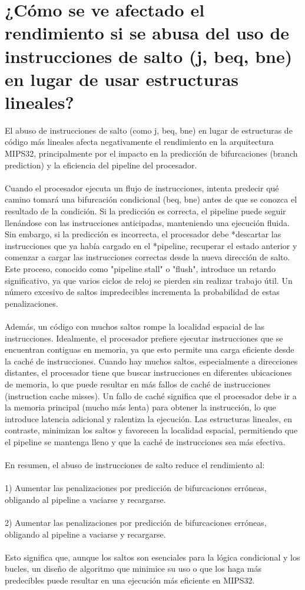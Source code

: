 \documentclass{article}
\begin{document}
\section{¿Cómo se ve afectado el rendimiento si se abusa del uso de instrucciones de salto (j, beq, bne) en lugar de usar estructuras lineales?}
El abuso de instrucciones de salto (como j, beq, bne) en lugar de estructuras de código más lineales afecta negativamente el rendimiento en la arquitectura MIPS32, principalmente por el impacto en la predicción de bifurcaciones (branch prediction) y la eficiencia del pipeline del procesador.
\\
\\Cuando el procesador ejecuta un flujo de instrucciones, intenta predecir qué camino tomará una bifurcación condicional (beq, bne) antes de que se conozca el resultado de la condición. Si la predicción es correcta, el pipeline puede seguir llenándose con las instrucciones anticipadas, manteniendo una ejecución fluida. Sin embargo, si la predicción es incorrecta, el procesador debe *descartar las instrucciones que ya había cargado en el *pipeline, recuperar el estado anterior y comenzar a cargar las instrucciones correctas desde la nueva dirección de salto. Este proceso, conocido como "pipeline stall" o "flush", introduce un retardo significativo, ya que varios ciclos de reloj se pierden sin realizar trabajo útil. Un número excesivo de saltos impredecibles incrementa la probabilidad de estas penalizaciones.
\\
\\Además, un código con muchos saltos rompe la localidad espacial de las instrucciones. Idealmente, el procesador prefiere ejecutar instrucciones que se encuentran contiguas en memoria, ya que esto permite una carga eficiente desde la caché de instrucciones. Cuando hay muchos saltos, especialmente a direcciones distantes, el procesador tiene que buscar instrucciones en diferentes ubicaciones de memoria, lo que puede resultar en más fallos de caché de instrucciones (instruction cache misses). Un fallo de caché significa que el procesador debe ir a la memoria principal (mucho más lenta) para obtener la instrucción, lo que introduce latencia adicional y ralentiza la ejecución. Las estructuras lineales, en contraste, minimizan los saltos y favorecen la localidad espacial, permitiendo que el pipeline se mantenga lleno y que la caché de instrucciones sea más efectiva.
\\
\\En resumen, el abuso de instrucciones de salto reduce el rendimiento al:
\\
\\1) Aumentar las penalizaciones por predicción de bifurcaciones erróneas, obligando al pipeline a vaciarse y recargarse.
\\
\\2) Aumentar las penalizaciones por predicción de bifurcaciones erróneas, obligando al pipeline a vaciarse y recargarse.
\\
\\Esto significa que, aunque los saltos son esenciales para la lógica condicional y los bucles, un diseño de algoritmo que minimice su uso o que los haga más predecibles puede resultar en una ejecución más eficiente en MIPS32.
\end{document}
